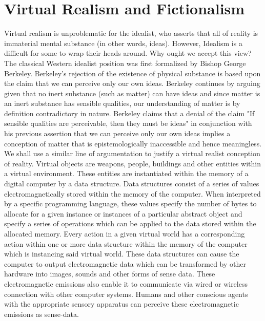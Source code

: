 \section{Virtual Realism and Fictionalism}
Virtual realism is unproblematic for the idealist, who asserts that all of reality is immaterial mental substance (in other words, ideas). However, Idealism is a difficult for some to wrap their heads around. Why ought we accept this view? The classical Western idealist position was first formalized by Bishop George Berkeley. Berkeley's rejection of the existence of physical substance is based upon the claim that we can perceive only our own ideas. Berkeley continues by arguing given that no inert substance (such as matter) can have ideas and since \textbf{\textit{}}matter is an inert substance has sensible qualities, our understanding of matter is by definition contradictory in nature. Berkeley claims that a denial of the claim "If sensible qualities are perceivable, then they must be ideas" in conjunction with his previous assertion that we can perceive only our own ideas implies a conception of matter that is epistemologically inaccessible and hence meaningless. \cite{berkeley2003a}
\\

 We shall use a similar line of argumentation to justify a virtual realist conception of reality. Virtual objects are weapons, people, buildings and other entities within a virtual environment. These entities are instantiated within the memory of a digital computer by a data structure. Data structures consist of a series of values electromagnetically stored within the memory of the computer. When interpreted by a specific programming language, these values specify the number of bytes to allocate for a given instance or instances of a particular abstract object and specify a series of operations which can be applied to the data stored within the allocated memory. Every action in a given virtual world has a corresponding action within one or more data structure within the memory of the computer which is instancing said virtual world. These data structures can cause the computer to output electromagnetic data which can be transformed by other hardware into images, sounds and other forms of sense data. These electromagnetic emissions also enable it to communicate via wired or wireless connection with other computer systems. Humans and other conscious agents with the appropriate sensory apparatus can perceive these electromagnetic emissions as sense-data.
 \\
 

